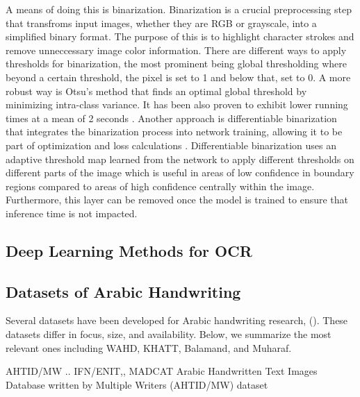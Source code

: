 \documentclass[conference]{IEEEtran}
\begin{document}
A means of doing this is binarization. Binarization is a crucial preprocessing step that transfroms input images, whether they are RGB or grayscale, into a simplified binary format. The purpose of this is to highlight character strokes and remove unneccessary image color information. There are different ways to apply thresholds for binarization, the most prominent being global thresholding where beyond a certain threshold, the pixel is set to 1 and below that, set to 0. A more robust way is Otsu's method \cite{otsu1979aa} that finds an optimal global threshold by minimizing intra-class variance. It has been also proven to exhibit lower running times at a mean of 2 seconds \cite{sahlol2014proposed}. Another approach is differentiable binarization that integrates the binarization process into network training, allowing it to be part of optimization and loss calculations \cite{liao2022real}. Differentiable binarization uses an adaptive threshold map learned from the network to apply different thresholds on different parts of the image which is useful in areas of low confidence in boundary regions compared to areas of high confidence centrally within the image. Furthermore, this layer can be removed once the model is trained to ensure that inference time is not impacted.  


\subsection{Deep Learning Methods for OCR}





\subsection{Datasets of Arabic Handwriting}

Several datasets have been developed for Arabic handwriting research, (). These datasets differ in focus, size, and availability. Below, we summarize the most relevant ones including WAHD, KHATT, Balamand, and Muharaf.



AHTID/MW .. IFN/ENIT,, MADCAT
Arabic Handwritten Text Images Database written by Multiple Writers (AHTID/MW) dataset
\end{document}
